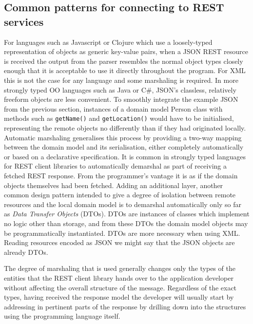 \documentclass[12pt, ]{article}
\begin{document}
\subsection{Common patterns for connecting to REST
services}\label{common-patterns-for-connecting-to-rest-services}

For languages such as Javascript or Clojure which use a loosely-typed
representation of objects as generic key-value pairs, when a JSON REST
resource is received the output from the parser resembles the normal
object types closely enough that it is acceptable to use it directly
throughout the program. For XML this is not the case for any language
and some marshaling is required. In more strongly typed OO languages
such as Java or C\#, JSON's classless, relatively freeform objects are
less convenient. To smoothly integrate the example JSON from the
previous section, instances of a domain model Person class with methods
such as \texttt{getName()} and \texttt{getLocation()} would have to be
initialised, representing the remote objects no differently than if they
had originated locally. Automatic marshaling generalises this process by
providing a two-way mapping between the domain model and its
serialisation, either completely automatically or based on a declarative
specification. It is common in strongly typed languages for REST client
libraries to automatically demarshal as part of receiving a fetched REST
response. From the programmer's vantage it is as if the domain objects
themselves had been fetched. Adding an additional layer, another common
design pattern intended to give a degree of isolation between remote
resources and the local domain model is to demarshal automatically only
so far as \emph{Data Transfer Objects} (DTOs). DTOs are instances of
classes which implement no logic other than storage, and from these DTOs
the domain model objects may be programmatically instantiated. DTOs are
more necessary when using XML. Reading resources encoded as JSON we
might say that the JSON objects are already DTOs.

The degree of marshaling that is used generally changes only the types
of the entities that the REST client library hands over to the
application developer without affecting the overall structure of the
message. Regardless of the exact types, having received the response
model the developer will usually start by addressing in pertinent parts
of the response by drilling down into the structures using the
programming language itself.
\end{document}
